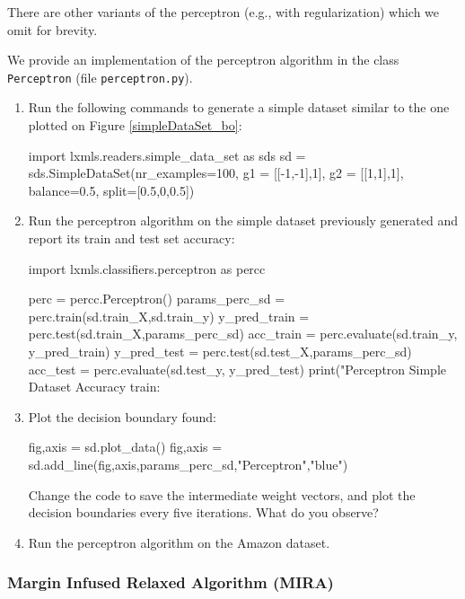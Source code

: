 There are other variants of the perceptron (e.g., with regularization) which we omit for brevity. 

\begin{exercise}
We provide an implementation of the perceptron algorithm in the class {\tt Perceptron} 
(file {\tt perceptron.py}).  
\begin{enumerate}
\item Run the following commands to generate a simple dataset similar to the one plotted on Figure \ref{simpleDataSet_bo}:

\begin{python}
import lxmls.readers.simple_data_set as sds
sd = sds.SimpleDataSet(nr_examples=100, g1 = [[-1,-1],1], g2 = [[1,1],1], balance=0.5, split=[0.5,0,0.5])
\end{python}

\item Run the perceptron algorithm on the simple dataset
previously generated and report its train and test set accuracy: 

\begin{python}
import lxmls.classifiers.perceptron as percc

perc = percc.Perceptron()
params_perc_sd = perc.train(sd.train_X,sd.train_y)
y_pred_train = perc.test(sd.train_X,params_perc_sd)
acc_train = perc.evaluate(sd.train_y, y_pred_train)
y_pred_test = perc.test(sd.test_X,params_perc_sd)
acc_test = perc.evaluate(sd.test_y, y_pred_test)
print("Perceptron Simple Dataset Accuracy train: %
\end{python}

\item Plot the decision boundary found:
\begin{python}
fig,axis = sd.plot_data()
fig,axis = sd.add_line(fig,axis,params_perc_sd,"Perceptron","blue")
\end{python}
Change the code to save the intermediate weight vectors,
and plot the decision boundaries every five iterations. What do you observe?

\item Run the perceptron algorithm on the Amazon dataset. 
\end{enumerate}
\end{exercise}

\subsubsection{Margin Infused Relaxed Algorithm (MIRA)}


